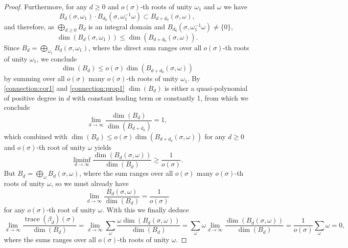 \documentclass[a4paper]{amsart}
\DeclareMathOperator{\trace}{\mathrm{trace}}
\begin{document}
\begin{proof}
	Furthermore, for any $d\geq 0$ and $o(\sigma)$-th roots of unity $\omega_1$ and $\omega$ we have
	\begin{displaymath}
		B_{d}(\sigma,\omega_1)\cdot B_{d_0}(\sigma,\omega_1^{-1}\omega)\subset B_{d+d_0}(\sigma,\omega),
	\end{displaymath}
	and therefore, as $\bigoplus_{d\geq0}B_d$ is an integral domain and $B_{d_0}(\sigma,\omega_1^{-1}\omega)\neq\{0\}$,
	\begin{displaymath}
		\dim(B_{d}(\sigma,\omega_1))\leq
		\dim(B_{d+d_0}(\sigma,\omega)).
	\end{displaymath}
	Since $B_{d}=\bigoplus_{\omega_1}B_{d}(\sigma,\omega_1)$,
	where the direct sum ranges over all $o(\sigma)$-th roots of unity $\omega_1$,
	we conclude
	\begin{displaymath}
		\dim(B_{d})\leq
		o(\sigma)\dim(B_{d+d_0}(\sigma,\omega))
	\end{displaymath}
	by summing over all $o(\sigma)$ many $o(\sigma)$-th roots of unity $\omega_1$.
	By \cref{connection:cor1} and \cref{connection:prop1} $\dim(B_d)$ is either a quasi-polynomial of positive degree in $d$ with constant leading term or constantly 1,
	from which we conclude
	\begin{displaymath}
		\lim\limits_{d\to\infty}\frac{\dim(B_{d})}{\dim(B_{d+d_0})}=1,
	\end{displaymath}
	which combined with
	$\dim(B_{d})\leq
		o(\sigma)\dim(B_{d+d_0}(\sigma,\omega))$ for any $d\geq0$ and $o(\sigma)$-th root of unity $\omega$ yields
	\begin{displaymath}
		\liminf_{d\to\infty}\frac{\dim(B_d(\sigma,\omega))}{\dim(B_d)}\geq\frac{1}{o(\sigma)}.
	\end{displaymath}
	But $B_d=\bigoplus_{\omega}B_d(\sigma,\omega)$, where the sum ranges over all $o(\sigma)$ many $o(\sigma)$-th roots of unity $\omega$,
	so we must already have
	\begin{displaymath}
		\lim\limits_{d\to\infty}\frac{B_d(\sigma,\omega)}{\dim(B_d)}=\frac{1}{o(\sigma)}
	\end{displaymath}
	for any $o(\sigma)$-th root of unity $\omega$.
	With this we finally deduce
	\begin{displaymath}
		\lim\limits_{d\to\infty}\frac{\trace(\beta_d)(\sigma)}{\dim(B_d)}=
		\lim\limits_{d\to\infty}\sum\limits_{\omega}\frac{\omega\dim(B_d(\sigma,\omega))}{\dim(B_d)}=
		\sum\limits_{\omega}\omega\lim\limits_{d\to\infty}\frac{\dim(B_d(\sigma,\omega))}{\dim(B_d)}=
		\frac{1}{o(\sigma)}\sum\limits_{\omega}\omega=
		0,
	\end{displaymath}
	where the sums ranges over all $o(\sigma)$-th roots of unity $\omega$.
\end{proof}
\end{document}
